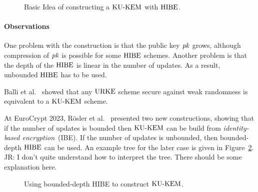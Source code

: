 \begin{figure}[!ht]
    \centering
    
    \caption{Basic Idea of constructing a $\mathrm{KU}\text{-}\mathrm{KEM}$ with $\mathrm{HIBE}$.}
    \label{fig:kukem:construction:idea}
\end{figure}

\paragraph{Observations} 
One problem with the construction is that the public key $\mathit{pk}$ grows, although compression of $\mathit{pk}$ is possible for some $\mathrm{HIBE}$ schemes.
Another problem is that the depth of the $\mathrm{HIBE}$ is linear in the number of updates. 
As a result, unbounded $\mathrm{HIBE}$ has to be used.

Balli et al.~\cite{AC:BalRosVau20} showed that any $\mathrm{URKE}$ scheme secure against weak randomness is equivalent to a $\mathrm{KU}\text{-}\mathrm{KEM}$ scheme.

At EuroCrypt 2023, Rösler et al.~\cite{EC:RosSlaStr23} presented two new constructions, showing that if the number of updates is bounded then $\mathrm{KU}\text{-}\mathrm{KEM}$ can be build from \emph{identity-based encryption}~(IBE).
If the number of updates is unbounded, then bounded-depth $\mathrm{HIBE}$ can be used. An example tree for the later case is given in Figure~\ref{fig:kukem:upibe}. \alert{JR: I don't quite understand how to interpret the tree. There should be some explanation here.}

\begin{figure}[!ht]
    \centering
    
    \caption{Using bounded-depth HIBE to construct $\mathrm{KU}\text{-}\mathrm{KEM}$.}
    \label{fig:kukem:upibe}
\end{figure}